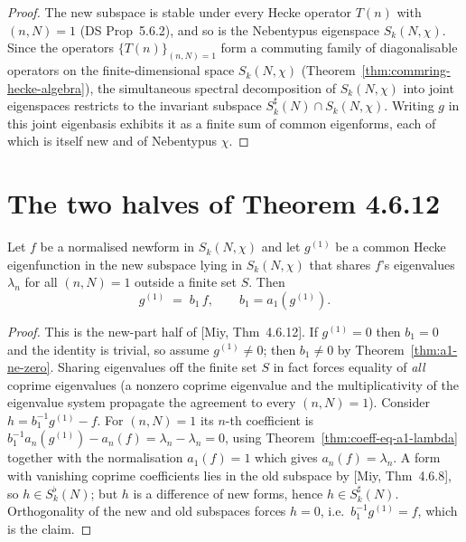 \begin{proof}
\leanok
The new subspace is stable under every Hecke operator $T(n)$ with $(n,N)=1$ (DS Prop~5.6.2), and so is the
Nebentypus eigenspace $S_k(N,\chi)$. Since the operators $\{T(n)\}_{(n,N)=1}$ form a commuting family of
diagonalisable operators on the finite-dimensional space $S_k(N,\chi)$
(Theorem~\ref{thm:commring-hecke-algebra}), the simultaneous spectral decomposition of $S_k(N,\chi)$ into
joint eigenspaces restricts to the invariant subspace $S_k^{\sharp}(N)\cap S_k(N,\chi)$. Writing $g$ in
this joint eigenbasis exhibits it as a finite sum of common eigenforms, each of which is itself new and of
Nebentypus $\chi$.
\end{proof}

\section{The two halves of Theorem 4.6.12}

\begin{theorem}\label{thm:newPart-eq-smul}
\leanok
Let $f$ be a normalised newform in $S_k(N,\chi)$ and let $g^{(1)}$ be a common Hecke eigenfunction in the
new subspace lying in $S_k(N,\chi)$ that shares $f$'s eigenvalues $\lambda_n$ for all $(n,N)=1$ outside a
finite set $S$. Then
\[
  g^{(1)} \;=\; b_1\,f, \qquad b_1=a_1(g^{(1)}).
\]
\end{theorem}

\begin{proof}
\leanok
This is the new-part half of [Miy, Thm~4.6.12]. If $g^{(1)}=0$ then $b_1=0$ and the identity is trivial,
so assume $g^{(1)}\neq 0$; then $b_1\neq 0$ by Theorem~\ref{thm:a1-ne-zero}. Sharing eigenvalues off the
finite set $S$ in fact forces equality of \emph{all} coprime eigenvalues (a nonzero coprime eigenvalue and
the multiplicativity of the eigenvalue system propagate the agreement to every $(n,N)=1$). Consider
$h=b_1^{-1}g^{(1)}-f$. For $(n,N)=1$ its $n$-th coefficient is
$b_1^{-1}a_n(g^{(1)})-a_n(f)=\lambda_n-\lambda_n=0$, using Theorem~\ref{thm:coeff-eq-a1-lambda} together
with the normalisation $a_1(f)=1$ which gives $a_n(f)=\lambda_n$. A form with vanishing coprime
coefficients lies in the old subspace by [Miy, Thm~4.6.8], so $h\in S_k^{\flat}(N)$; but $h$ is a
difference of new forms, hence $h\in S_k^{\sharp}(N)$. Orthogonality of the new and old subspaces forces
$h=0$, i.e.\ $b_1^{-1}g^{(1)}=f$, which is the claim.
\end{proof}

